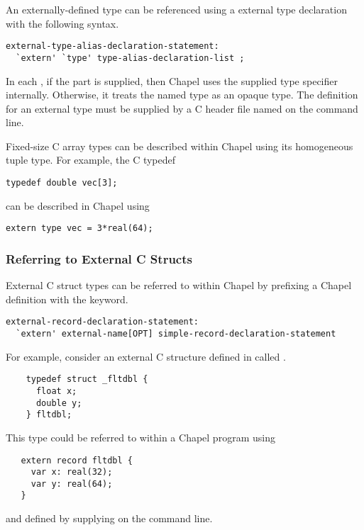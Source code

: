 An externally-defined type can be referenced using a external type declaration
with the following syntax.
\begin{syntax}
\begin{verbatim}
external-type-alias-declaration-statement:
  `extern' `type' type-alias-declaration-list ;
\end{verbatim}
\end{syntax}

In each , if the  part is
supplied, then Chapel uses the supplied type specifier internally.  Otherwise,
it treats the named type as an opaque type.  The definition for an external type
must be supplied by a C header file named on the  command line.

Fixed-size C array types can be described within Chapel using its
homogeneous tuple type.  For example, the C typedef
\begin{chapel}
\begin{verbatim}
typedef double vec[3];
\end{verbatim}
\end{chapel}
can be described in Chapel using
\begin{chapel}
\begin{verbatim}
extern type vec = 3*real(64);
\end{verbatim}
\end{chapel}


\subsubsection{Referring to External C Structs}
\label{Referring_to_External_C_Structs}

External C struct types can be referred to within Chapel by prefixing
a Chapel  definition with the  keyword.
\begin{syntax}
\begin{verbatim}
external-record-declaration-statement:
  `extern' external-name[OPT] simple-record-declaration-statement
\end{verbatim}
\end{syntax}

For example, consider an external C structure defined in  called .
\begin{chapel}
\begin{verbatim}
    typedef struct _fltdbl {
      float x;
      double y;
    } fltdbl;
\end{verbatim}
\end{chapel}
This type could be referred to within a Chapel program using
\begin{chapel}
\begin{verbatim}
   extern record fltdbl {
     var x: real(32);
     var y: real(64);
   }
\end{verbatim}
\end{chapel}
\noindent
and defined by supplying  on the  command line.

